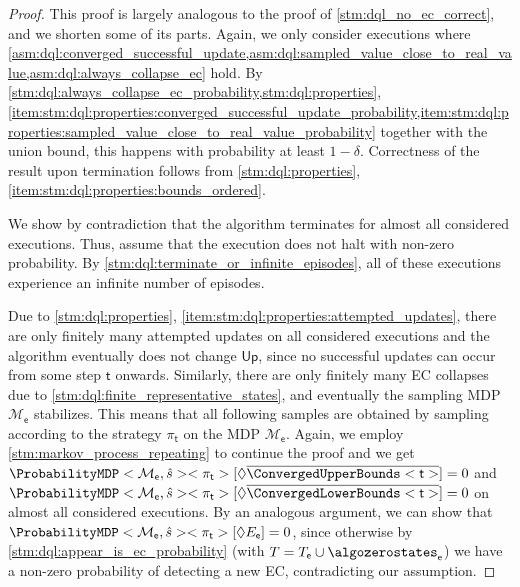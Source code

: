 \documentclass{theoretics}
\newcommand{\unionSym}{\cup}
\newcommand{\unionBin}{\mathbin{\unionSym}}
\newcommand{\union}{\unionBin}
\newcommand{\MDP}{\mathcal{M}}
\newcommand{\initialstate}{\hat{s}}
\newcommand{\strategy}{\pi}
\newcommand{\reach}{\Diamond}
\newcommand{\upperbound}{\mathsf{Up}}
\newcommand{\targetset}{T}
\newcommand{\algostep}{\mathsf{t}}
\newcommand{\algoepisode}{\mathsf{e}}
\begin{document}
\begin{proof}
	This proof is largely analogous to the proof of \cref{stm:dql_no_ec_correct}, and we shorten some of its parts.
	Again, we only consider executions where \cref{asm:dql:converged_successful_update,asm:dql:sampled_value_close_to_real_value,asm:dql:always_collapse_ec} hold.
	By \cref{stm:dql:always_collapse_ec_probability,stm:dql:properties}, \cref{item:stm:dql:properties:converged_successful_update_probability,item:stm:dql:properties:sampled_value_close_to_real_value_probability} together with the union bound, this happens with probability at least $1 - \delta$.
	Correctness of the result upon termination follows from \cref{stm:dql:properties}, \cref{item:stm:dql:properties:bounds_ordered}.

	We show by contradiction that the algorithm terminates for almost all considered executions.
	Thus, assume that the execution does not halt with non-zero probability.
	By \cref{stm:dql:terminate_or_infinite_episodes}, all of these executions experience an infinite number of episodes.

	Due to \cref{stm:dql:properties}, \cref{item:stm:dql:properties:attempted_updates}, there are only finitely many attempted updates on all considered executions and the algorithm eventually does not change $\upperbound$, since no successful updates can occur from some step $\algostep$ onwards.
	Similarly, there are only finitely many EC collapses due to \cref{stm:dql:finite_representative_states}, and eventually the sampling MDP $\MDP_\algoepisode$ stabilizes.
	This means that all following samples are obtained by sampling according to the strategy $\strategy_\algostep$ on the MDP $\MDP_\algoepisode$.
	Again, we employ \cref{stm:markov_process_repeating} to continue the proof and we get $\ProbabilityMDP<\MDP_\algoepisode, \initialstate><\strategy_\algostep>[\reach \overline{\ConvergedUpperBounds<\algostep>}] = 0$ and $\ProbabilityMDP<\MDP_\algoepisode, \initialstate><\strategy_\algostep>[\reach \overline{\ConvergedLowerBounds<\algostep>}] = 0$ on almost all considered executions.
	By an analogous argument, we can show that $\ProbabilityMDP<\MDP_\algoepisode, \initialstate><\strategy_\algostep>[\reach E_\algoepisode] = 0$, since otherwise by \cref{stm:dql:appear_is_ec_probability} (with $\targetset = \targetset_\algoepisode \union \algozerostates_\algoepisode$) we have a non-zero probability of detecting a new EC, contradicting our assumption.


\end{proof}
\end{document}
